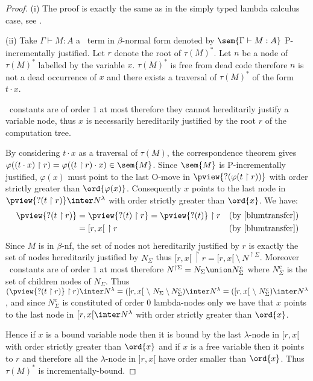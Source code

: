 \begin{proof}
(i) The proof is exactly the same as in the simply typed lambda calculus case,
see \cite[Proposition 4.1.5(i)]{blumtransfer}.

\noindent (ii)
Take $\Gamma \vdash M : A$ a \pcf\ term in $\beta$-normal form denoted by $\sem{\Gamma \vdash M : A}$ P-incrementally justified. Let $r$ denote the root of $\tau(M)^*$.
Let $n$ be a node of $\tau(M)^*$ labelled by the variable $x$.
$\tau(M)^*$ is free from dead code therefore $n$ is not a dead occurrence of $x$ and there exists a traversal of $\tau(M)^*$ of the form $t \cdot x$.

\pcf\ constants are of order $1$ at most therefore they cannot hereditarily justify a variable node, thus $x$ is necessarily hereditarily justified by the root $r$ of the computation tree.


By considering $t\cdot x$ as a traversal of $\tau(M)$,  the correspondence theorem gives $\varphi((t \cdot x) \upharpoonright r) = \varphi((t \upharpoonright r) \cdot x) \in \sem{M}$. Since $\sem{M}$ is P-incrementally justified, $\varphi(x)$ must point to the last O-move in $\pview{?(\varphi(t \upharpoonright
r))}$ with order strictly greater than $\ord{\varphi(x)}$.
Consequently $x$ points to the last node in $\pview{?(t
\upharpoonright r)} \inter N^{\lambda}$ with order strictly greater than $\ord{x}$. We have:
\begin{align*}
\pview{?(t \upharpoonright r)} &= \pview{?(t) \upharpoonright r} = \pview{?(t)} \upharpoonright r & (\mbox{by \cite[lemma 3.1.23]{blumtransfer}}) \\
& = [r,x[ \ \upharpoonright r & (\mbox{by \cite[proposition 3.1.20]{blumtransfer}})
\end{align*}
Since $M$ is in $\beta$-nf, the set of nodes not hereditarily justified by $r$ is exactly the set of nodes hereditarily justified by $N_{\Sigma}$ thus
$[r,x[ \ \upharpoonright r = [r,x[\ \setminus\  N^{\upharpoonright \Sigma}$.
Moreover \pcf\ constants are of order $1$ at most therefore $N^{\upharpoonright \Sigma} = N_{\Sigma} \union N^c_{\Sigma}$
where $N^c_{\Sigma}$ is the set of children nodes of $N_{\Sigma}$.
Thus $(\pview{?(t \upharpoonright r)}\upharpoonright r) \inter N^{\lambda} =
([r,x[\ \setminus\  N_{\Sigma} \setminus N^c_{\Sigma} ) \inter N^{\lambda} =
([r,x[\ \setminus\  N^c_{\Sigma} )  \inter N^{\lambda}$, and
since $N^c_{\Sigma}$ is constituted of order $0$ lambda-nodes only we have that
$x$ points to the last node in $[r,x[ \inter N^{\lambda}$ with order strictly greater than $\ord{x}$.

Hence if $x$ is a bound variable node then it is bound by the
last $\lambda$-node in $[r,x[$ with order strictly greater than
$\ord{x}$ and if $x$ is a free variable then it points to $r$ and
therefore all the $\lambda$-node in $]r,x[$ have order smaller than
$\ord{x}$. Thus $\tau(M)^*$ is incrementally-bound.
\end{proof}

